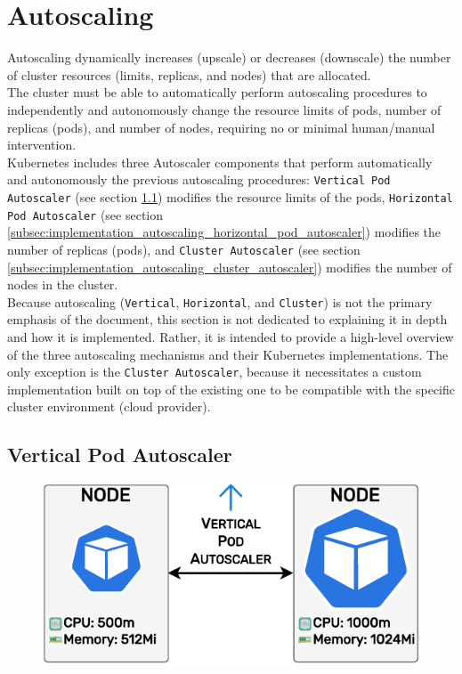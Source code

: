 \section{Autoscaling}
\label{sec:implementation_autoscaling}

Autoscaling dynamically increases (upscale) or decreases (downscale) the number of
cluster resources (limits, replicas, and nodes) that are allocated. \\ %

The cluster must be able to automatically perform autoscaling procedures to
independently and autonomously change the resource limits of pods, number of replicas
(pods), and number of nodes, requiring no or minimal human/manual intervention.
\\ %
Kubernetes includes three Autoscaler components that perform automatically and autonomously
the previous autoscaling procedures: \texttt{Vertical Pod Autoscaler} (see
section \ref{subsec:implementation_autoscaling_vertical_pod_autoscaler}) modifies
the resource limits of the pods, \texttt{Horizontal Pod Autoscaler} (see section
\ref{subsec:implementation_autoscaling_horizontal_pod_autoscaler}) modifies the number
of replicas (pods), and \texttt{Cluster Autoscaler} (see section
\ref{subsec:implementation_autoscaling_cluster_autoscaler}) modifies the number of
nodes in the cluster. \\ %

Because autoscaling (\texttt{Vertical}, \texttt{Horizontal}, and \texttt{Cluster})
is not the primary emphasis of the document, this section is not dedicated to
explaining it in depth and how it is implemented. Rather, it is intended to
provide a high-level overview of the three autoscaling mechanisms and their
Kubernetes implementations. The only exception is the \texttt{Cluster Autoscaler},
because it necessitates a custom implementation built on top of the existing one
to be compatible with the specific cluster environment (cloud provider).

\subsection{Vertical Pod Autoscaler}
\label{subsec:implementation_autoscaling_vertical_pod_autoscaler}

\begin{figure}
  \centering
  \includegraphics[width=\linewidth]{
    images/implementation/vertical_pod_autoscaler.pdf
  }
\end{figure}

